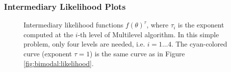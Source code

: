 \subsubsection{Intermediary Likelihood Plots}
\begin{figure}[htpb]
\centering
{}
\vspace{-10pt}
\caption{Intermediary likelihood functions $f(\theta)^\tau$, where $\tau_i$ is the exponent computed at the $i$-th level of Multilevel algorithm. In this simple problem, only four levels are needed, i.e. $i=1\ldots 4$. The cyan-colored curve (exponent $\tau = 1$) is the same curve as in Figure \ref{fig:bimodal:likelihood}.}
\label{fig:bimodal:likelihood_taus}
\end{figure}
